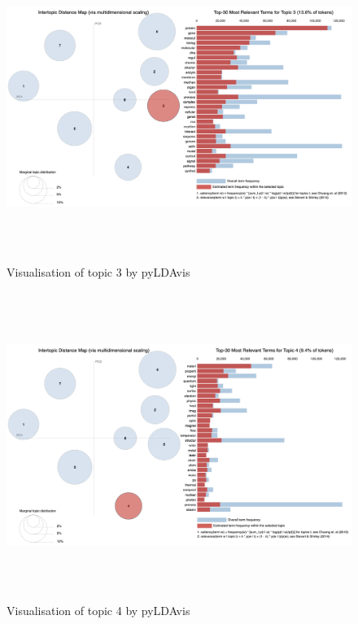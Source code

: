 \begin{figure}[H]
    \centering
    \includegraphics[width = 16cm, height = 10cm]{./img/pylda_topic3.png}
    \caption{Visualisation of topic 3 by pyLDAvis}
\end{figure}

\begin{figure}[H]
    \centering
    \includegraphics[width = 16cm, height = 10cm]{./img/pylda_topic4.png}
    \caption{Visualisation of topic 4 by pyLDAvis}
\end{figure}


